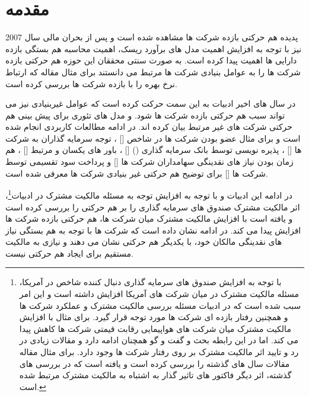 \section{مقدمه}
پدیده هم حرکتی بازده شرکت ها مشاهده شده است و پس از بحران مالی سال 2007 نیز با توجه به افزایش اهمیت مدل های برآورد ریسک، اهمیت محاسبه هم بستگی بازده دارایی ها اهمیت پیدا کرده است. به صورت سنتی محققان این حوزه هم حرکتی بازده شرکت ها را به عوامل بنیادی شرکت ها مرتبط می دانستند برای مثال مقاله
  که ارتباط نرخ بهره را با بازده شرکت ها بررسی کرده است.
  
    در سال های اخیر ادبیات به این سمت حرکت کرده است که عوامل غیربنیادی نیز می تواند سبب هم حرکتی بازده شرکت ها شود.
  و
 مدل های تئوری برای پیش بینی هم حرکتی شرکت های غیر مرتبط بیان کرده اند.  در ادامه مطالعات کاربردی انجام شده است و برای مثال 
  عضو بودن شرکت ها در شاخص
    []
   ،
         توجه سرمایه گذاران به شرکت ها
         []  
 ،
         پذیره نویسی توسط بانک سرمایه گذاری 
         ()
         []  
،
         باور های یکسان و مرتبط
         [] 
،
            هم زمان بودن نیاز های نقدینگی سهامداران شرکت ها
            []  
و
            پرداخت سود تقسیمی توسط شرکت ها
            [] 
           برای توضیح هم حرکتی غیر بنیادی شرکت ها معرفی شده است.
          
در ادامه این ادبیات و با توجه به افزایش توجه به مسئله مالکیت مشترک در ادبیات\footnote{
	با توجه به افزایش صندوق های سرمایه گذاری  دنبال کننده شاخص در آمریکا، مسئله مالکیت مشترک در میان شرکت های آمریکا افزایش داشته است و این امر سبب شده است که در ادبیات مسئله بررسی مالکیت مشترک و عملکرد شرکت ها و همچنین رفتار بازده ای شرکت ها مورد توجه قرار گیرد. 
	برای مثال 
	با افزایش مالکیت مشترک میان شرکت های هواپیمایی رقابت قیمتی شرکت ها کاهش پیدا می کند.  اما در این رابطه بحث و گفت و گو همچنان ادامه دارد و مقالات زیادی در رد و تایید اثر مالکیت مشترک بر روی رفتار شرکت ها وجود دارد. برای مثال مقاله
	مقالات سال های گذشته را بررسی کرده است و یافته است که در بررسی های گذشته، اثر دیگر فاکتور های تاثیر گذار به اشتباه به مالکیت مشترک مرتبط شده است.
}،          
 اثر مالکیت مشترک صندوق های سرمایه گذاری را بر هم حرکتی را بررسی کرده است و یافته است با افزایش مالکیت مشترک میان شرکت ها، هم حرکتی بازده شرکت ها افزایش پیدا می کند. 
   در ادامه 
   نشان داده است که شرکت ها با توجه به هم بستگی نیاز های نقدینگی مالکان خود، با یکدیگر هم حرکتی نشان می دهند و نیازی به مالکیت مستقیم برای ایجاد هم حرکتی نیست.
   
